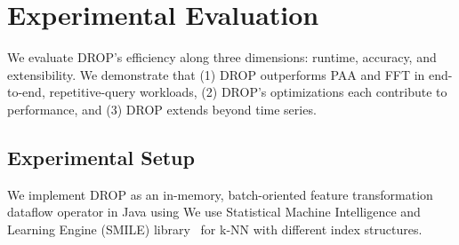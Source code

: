 
\section{Experimental Evaluation}
\label{sec:experiments}

We evaluate DROP's efficiency along three dimensions: runtime, accuracy, and extensibility. We demonstrate that (1) DROP outperforms PAA and FFT in end-to-end, repetitive-query workloads, (2) DROP's optimizations each contribute to performance,  and (3) DROP extends beyond time series.

\subsection{Experimental Setup}
\label{subsec:setup}
 We implement DROP as an in-memory, batch-oriented feature transformation dataflow operator in Java using 
We use  Statistical Machine Intelligence and Learning Engine (SMILE) library~\cite{smile} for k-NN with different index structures. 

